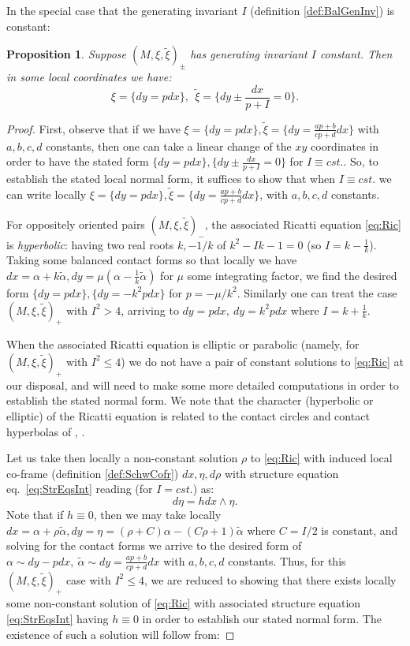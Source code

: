 \documentclass[10pt]{amsart}
\newtheorem{prop}[thm]{Proposition}
\theoremstyle{definition}
\begin{document}
In the special case that the generating invariant $I$ (definition \ref{def:BalGenInv}) is constant:

\begin{prop}\label{prop:Icst}
    Suppose $(M, \xi, \tilde \xi)_\pm$ has generating invariant $I$ constant. Then in some local coordinates we have:
    \[ \xi = \{ dy = pdx\}, ~~\tilde \xi = \{ dy \pm \frac{dx}{p + I} = 0 \}. \]
\end{prop}

\begin{proof} First, observe that if we have $\xi = \{ dy = pdx\}, \tilde\xi = \{ dy = \frac{ap + b}{cp +d}dx\}$ with $a,b,c,d$ constants, then one can take a linear change of the $xy$ coordinates in order to have the stated form $\{ dy = pdx\}, \{ dy \pm \frac{dx}{p+I} = 0\}$ for $I\equiv cst.$. So, to establish the stated local normal form, it suffices to show that when $I\equiv cst.$ we can write locally $\xi = \{ dy = pdx\}, \tilde\xi = \{ dy = \frac{ap + b}{cp +d}dx\}$, with $a,b,c,d$ constants.

For oppositely oriented pairs $(M, \xi, \tilde \xi)_-$, the associated Ricatti equation \eqref{eq:Ric} is {\em hyperbolic}: having two real roots $k, -1/k$ of $k^2 - Ik -1 = 0$ (so $I = k - \frac{1}{k}$). Taking some balanced contact forms so that locally we have $dx = \alpha + k \tilde\alpha, dy = \mu (\alpha - \frac{1}{k}\tilde\alpha)$ for $\mu$ some integrating factor, we find the desired form $\{ dy = pdx\}, \{ dy = - k^2pdx\}$ for $p = -\mu/k^2$. Similarly one can treat the case $(M,\xi,\tilde\xi)_+$ with $I^2 >4$, arriving to $dy = pdx, ~dy = k^2 p dx$ where $I = k + \frac{1}{k}$.

When the associated Ricatti equation is elliptic or parabolic (namely, for $(M, \xi, \tilde\xi)_+$ with $I^2 \le 4$) we do not have a pair of constant solutions to \eqref{eq:Ric} at our disposal, and will need to make some more detailed computations in order to establish the stated normal form. We note that the character (hyperbolic or elliptic) of the Ricatti equation is related to the contact circles and contact hyperbolas of \cite{Geig}, \cite{Perrone}.

Let us take then locally a non-constant solution $\rho$ to \eqref{eq:Ric} with induced local co-frame (definition \ref{def:SchwCofr}) $dx, \eta, d\rho$ with structure equation eq.~\eqref{eq:StrEqsInt} reading (for $I = cst.$) as:
\[ d\eta = hdx\wedge \eta. \]
Note that if $h \equiv 0$, then we may take locally $dx = \alpha + \rho\tilde\alpha, dy =  \eta = (\rho + C)\alpha - (C\rho + 1)\tilde\alpha$ where $C = I/2$ is constant, and solving for the contact forms we arrive to the desired form of $\alpha\sim dy - pdx, ~\tilde\alpha \sim dy = \frac{ap + b}{cp+d}dx$ with $a,b,c,d$ constants. Thus, for this $(M, \xi, \tilde\xi)_+$ case with $I^2 \le 4$, we are reduced to showing that there exists locally some non-constant solution of \eqref{eq:Ric} with associated structure equation \eqref{eq:StrEqsInt} having $h \equiv 0$ in order to establish our stated normal form. The existence of such a solution will follow from:


\end{proof}
\end{document}
